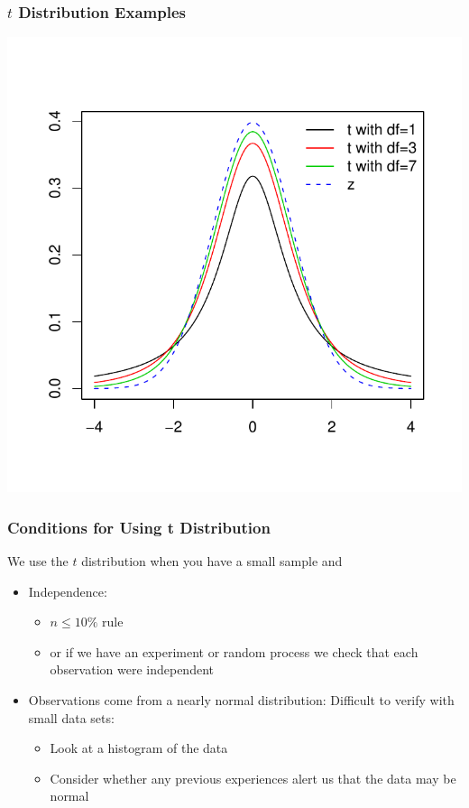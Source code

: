 \documentclass[handout]{beamer}
\newcommand{\blue}[1]{\textcolor{blue2}{#1}}
\begin{document}
\addtocounter{framenumber}{-1}
\begin{frame}
\frametitle{$t$ Distribution Examples}
\begin{center}
\includegraphics{figure/lec16-004}
\end{center}
\end{frame}


\begin{frame}
\frametitle{Conditions for Using t Distribution}
We use the $t$ distribution when you have a \blue{small sample} and

\begin{itemize}
\pause \item \blue{Independence}:
\begin{itemize}
\item $n \leq 10\% $ rule
\item or if we have an experiment or random process we check that each observation were independent
\end{itemize}
\pause \item \blue{Observations come from a nearly normal distribution}:  Difficult to verify with small data sets:
\begin{itemize}
\item Look at a histogram of the data
\item Consider whether any previous experiences alert us that the data may be normal
\end{itemize}
\end{itemize}  	
\end{frame}
\end{document}
